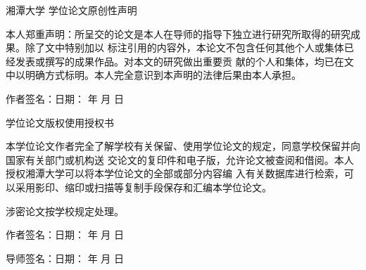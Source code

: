 ﻿%
\thispagestyle{empty}
\begin{center}
    {\heiti{}湘潭大学 \vskip5mm 学位论文原创性声明}
\end{center}
\songti{}

    本人郑重声明：所呈交的论文是本人在导师的指导下独立进行研究所取得的研究成果。除了文中特别加以
标注引用的内容外，本论文不包含任何其他个人或集体已经发表或撰写的成果作品。对本文的研究做出重要贡
献的个人和集体，均已在文中以明确方式标明。本人完全意识到本声明的法律后果由本人承担。
\vskip8mm

    作者签名：\hfill                          日期：\kern 1.6cm 年 \kern 0.8cm 月 \kern 0.8cm 日
\vskip30mm
\begin{center}
    {\heiti{}学位论文版权使用授权书}
\end{center}

    本学位论文作者完全了解学校有关保留、使用学位论文的规定，同意学校保留并向国家有关部门或机构送
交论文的复印件和电子版，允许论文被查阅和借阅。本人授权湘潭大学可以将本学位论文的全部或部分内容编
入有关数据库进行检索，可以采用影印、缩印或扫描等复制手段保存和汇编本学位论文。
\par
    涉密论文按学校规定处理。
\vskip30mm

    作者签名：\hfill                         日期：\kern 1.6cm 年 \kern 0.8cm 月 \kern 0.8cm 日
\vskip8mm

    导师签名：\hfill                         日期：\kern 1.6cm 年 \kern 0.8cm 月 \kern 0.8cm 日